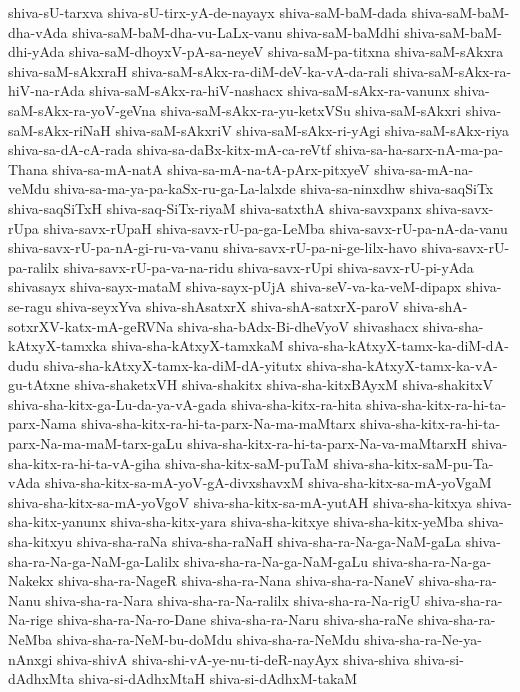 {shiva-sU-tarxva
shiva-sU-tirx-yA-de-nayayx
shiva-saM-baM-dada
shiva-saM-baM-dha-vAda
shiva-saM-baM-dha-vu-LaLx-vanu
shiva-saM-baMdhi
shiva-saM-baM-dhi-yAda
shiva-saM-dhoyxV-pA-sa-neyeV
shiva-saM-pa-titxna
shiva-saM-sAkxra
shiva-saM-sAkxraH
shiva-saM-sAkx-ra-diM-deV-ka-vA-da-rali
shiva-saM-sAkx-ra-hiV-na-rAda
shiva-saM-sAkx-ra-hiV-nashacx
shiva-saM-sAkx-ra-vanunx
shiva-saM-sAkx-ra-yoV-geVna
shiva-saM-sAkx-ra-yu-ketxVSu
shiva-saM-sAkxri
shiva-saM-sAkx-riNaH
shiva-saM-sAkxriV
shiva-saM-sAkx-ri-yAgi
shiva-saM-sAkx-riya
shiva-sa-dA-cA-rada
shiva-sa-daBx-kitx-mA-ca-reVtf
shiva-sa-ha-sarx-nA-ma-pa-Thana
shiva-sa-mA-natA
shiva-sa-mA-na-tA-pArx-pitxyeV
shiva-sa-mA-na-veMdu
shiva-sa-ma-ya-pa-kaSx-ru-ga-La-lalxde
shiva-sa-ninxdhw
shiva-saqSiTx
shiva-saqSiTxH
shiva-saq-SiTx-riyaM
shiva-satxthA
shiva-savxpanx
shiva-savx-rUpa
shiva-savx-rUpaH
shiva-savx-rU-pa-ga-LeMba
shiva-savx-rU-pa-nA-da-vanu
shiva-savx-rU-pa-nA-gi-ru-va-vanu
shiva-savx-rU-pa-ni-ge-lilx-havo
shiva-savx-rU-pa-ralilx
shiva-savx-rU-pa-va-na-ridu
shiva-savx-rUpi
shiva-savx-rU-pi-yAda
shivasayx
shiva-sayx-mataM
shiva-sayx-pUjA
shiva-seV-va-ka-veM-dipapx
shiva-se-ragu
shiva-seyxYva
shiva-shAsatxrX
shiva-shA-satxrX-paroV
shiva-shA-sotxrXV-katx-mA-geRVNa
shiva-sha-bAdx-Bi-dheVyoV
shivashacx
shiva-sha-kAtxyX-tamxka
shiva-sha-kAtxyX-tamxkaM
shiva-sha-kAtxyX-tamx-ka-diM-dA-dudu
shiva-sha-kAtxyX-tamx-ka-diM-dA-yitutx
shiva-sha-kAtxyX-tamx-ka-vA-gu-tAtxne
shiva-shaketxVH
shiva-shakitx
shiva-sha-kitxBAyxM
shiva-shakitxV
shiva-sha-kitx-ga-Lu-da-ya-vA-gada
shiva-sha-kitx-ra-hita
shiva-sha-kitx-ra-hi-ta-parx-Nama
shiva-sha-kitx-ra-hi-ta-parx-Na-ma-maMtarx
shiva-sha-kitx-ra-hi-ta-parx-Na-ma-maM-tarx-gaLu
shiva-sha-kitx-ra-hi-ta-parx-Na-va-maMtarxH
shiva-sha-kitx-ra-hi-ta-vA-giha
shiva-sha-kitx-saM-puTaM
shiva-sha-kitx-saM-pu-Ta-vAda
shiva-sha-kitx-sa-mA-yoV-gA-divxshavxM
shiva-sha-kitx-sa-mA-yoVgaM
shiva-sha-kitx-sa-mA-yoVgoV
shiva-sha-kitx-sa-mA-yutAH
shiva-sha-kitxya
shiva-sha-kitx-yanunx
shiva-sha-kitx-yara
shiva-sha-kitxye
shiva-sha-kitx-yeMba
shiva-sha-kitxyu
shiva-sha-raNa
shiva-sha-raNaH
shiva-sha-ra-Na-ga-NaM-gaLa
shiva-sha-ra-Na-ga-NaM-ga-Lalilx
shiva-sha-ra-Na-ga-NaM-gaLu
shiva-sha-ra-Na-ga-Nakekx
shiva-sha-ra-NageR
shiva-sha-ra-Nana
shiva-sha-ra-NaneV
shiva-sha-ra-Nanu
shiva-sha-ra-Nara
shiva-sha-ra-Na-ralilx
shiva-sha-ra-Na-rigU
shiva-sha-ra-Na-rige
shiva-sha-ra-Na-ro-Dane
shiva-sha-ra-Naru
shiva-sha-raNe
shiva-sha-ra-NeMba
shiva-sha-ra-NeM-bu-doMdu
shiva-sha-ra-NeMdu
shiva-sha-ra-Ne-ya-nAnxgi
shiva-shivA
shiva-shi-vA-ye-nu-ti-deR-nayAyx
shiva-shiva
shiva-si-dAdhxMta
shiva-si-dAdhxMtaH
shiva-si-dAdhxM-takaM
}
